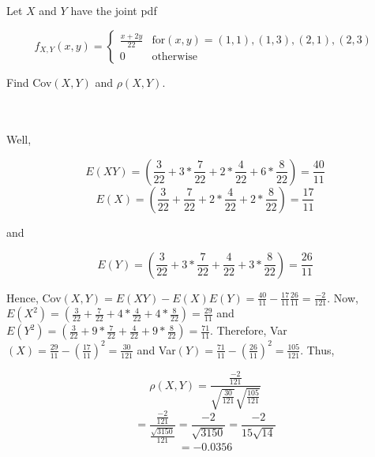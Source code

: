 Let $X$ and $Y$ have the joint pdf

$$f_{X,Y}(x,y)=\left \{ \begin{array}{cc}
                        \frac{x+2y}{22} & \text{for}  (x,y)=(1,1), (1,3), (2,1), (2,3) \\
                         0 & \text{otherwise} \end{array} \right.$$

Find Cov$(X,Y)$ and $\rho(X,Y)$.\\\\

\begin{solution}\renewcommand{\qedsymbol}{}\ \\
    Well,
    
    $$E(XY)=(\frac{3}{22}+3*\frac{7}{22}+2*\frac{4}{22}+6*\frac{8}{22})=\frac{40}{11}$$
    $$E(X)=(\frac{3}{22}+\frac{7}{22}+2*\frac{4}{22}+2*\frac{8}{22})=\frac{17}{11}$$
    
    and
    
    $$E(Y)=(\frac{3}{22}+3*\frac{7}{22}+\frac{4}{22}+3*\frac{8}{22})=\frac{26}{11}$$
    
    Hence, Cov$(X,Y)=E(XY)-E(X)E(Y)=\frac{40}{11}-\frac{17}{11}\frac{26}{11}=\frac{-2}{121}$. Now, 
    $E(X^2)=(\frac{3}{22}+\frac{7}{22}+4*\frac{4}{22}+4*\frac{8}{22})=\frac{29}{11}$ and
    $E(Y^2)=(\frac{3}{22}+9*\frac{7}{22}+\frac{4}{22}+9*\frac{8}{22})=\frac{71}{11}$. Therefore,
    Var$(X)=\frac{29}{11}-(\frac{17}{11})^2=\frac{30}{121}$ and
    Var$(Y)=\frac{71}{11}-(\frac{26}{11})^2=\frac{105}{121}$. Thus,
    
    $$\rho(X,Y)=\frac{\frac{-2}{121}}{\sqrt{\frac{30}{121}}\sqrt{\frac{105}{121}}}$$
    $$=\frac{\frac{-2}{121}}{\frac{\sqrt{3150}}{121}}=\frac{-2}{\sqrt{3150}}=\frac{-2}{15\sqrt{14}}$$
    $$=-0.0356$$

\end{solution}